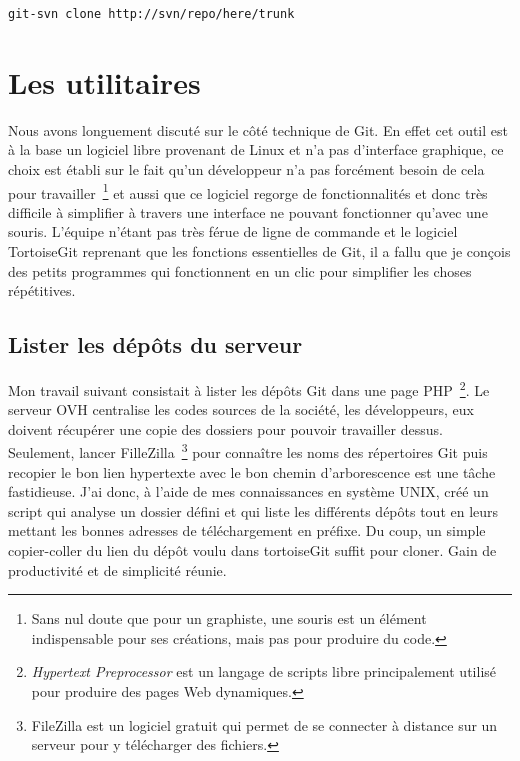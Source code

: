 \begin{lstlisting}[basicstyle=\ttfamily\small, frame=trBL]
git-svn clone http://svn/repo/here/trunk
\end{lstlisting}

\section{Les utilitaires} %

Nous avons longuement discuté sur le côté technique de Git. En effet cet outil
est à la base un logiciel libre provenant de Linux et n'a pas d'interface
graphique, ce choix est établi sur le fait qu'un développeur n'a pas forcément
besoin de cela pour travailler\, \footnote{Sans nul doute que pour un
graphiste, une souris est un élément indispensable pour ses créations, mais pas
pour produire du code.} et aussi que ce logiciel regorge de fonctionnalités et
donc très difficile à simplifier à travers une interface ne pouvant fonctionner
qu'avec une souris. L'équipe n'étant pas très férue de ligne de commande et le
logiciel TortoiseGit reprenant que les fonctions essentielles de Git, il a
fallu que je conçois des petits programmes qui fonctionnent en un clic pour
simplifier les choses répétitives.


\subsection{Lister les dépôts du serveur}

Mon travail suivant consistait à lister les dépôts Git dans une page PHP\,
\footnote{\emph{Hypertext Preprocessor} est un langage de scripts libre
principalement utilisé pour produire des pages Web dynamiques.}. Le serveur OVH
centralise les codes sources de la société, les développeurs, eux doivent
récupérer une copie des dossiers pour pouvoir travailler dessus. Seulement,
lancer FilleZilla\, \footnote{FileZilla est un logiciel gratuit qui permet de
se connecter à distance sur un serveur pour y télécharger des fichiers.} pour
connaître les noms des répertoires Git puis recopier le bon lien hypertexte
avec le bon chemin d'arborescence est une tâche fastidieuse.  J'ai donc, à
l'aide de mes connaissances en système UNIX, créé un script qui analyse un
dossier défini et qui liste les différents dépôts tout en leurs mettant les
bonnes adresses de téléchargement en préfixe. Du coup, un simple copier-coller
du lien du dépôt voulu dans tortoiseGit suffit pour cloner. Gain de
productivité et de simplicité réunie.

